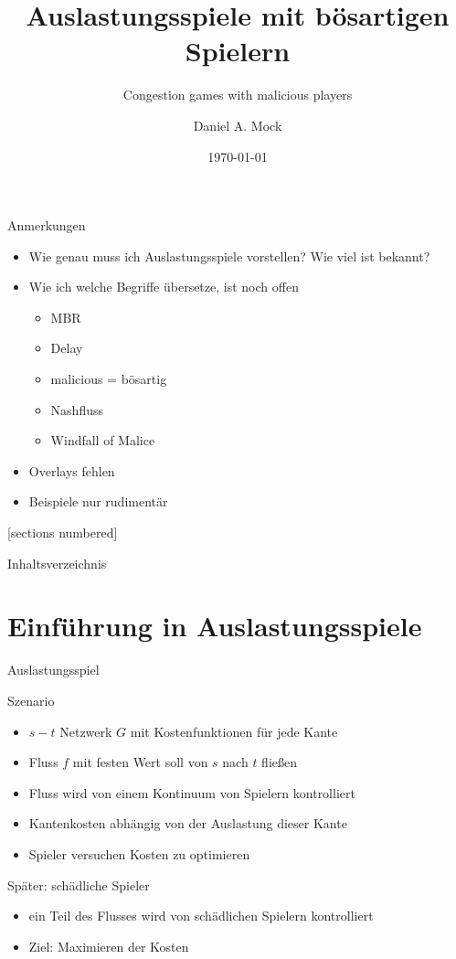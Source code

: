 \documentclass{beamer}
\title{Auslastungsspiele mit bösartigen Spielern}
\subtitle{Congestion games with malicious players}
\date{\today}
\author{Daniel A. Mock}
\institute{Lehrstuhl i1 -- RWTH Aachen}
\begin{document}
\begin{frame}{Anmerkungen}
	\begin{itemize}
		\item Wie genau muss ich Auslastungsspiele vorstellen? Wie viel ist bekannt?
		\item Wie ich welche Begriffe übersetze, ist noch offen
		\begin{itemize}
			\item MBR
			\item Delay
			\item malicious = bösartig
			\item Nashfluss
			\item Windfall of Malice
		\end{itemize}
		\item Overlays fehlen
		\item Beispiele nur rudimentär
	\end{itemize}
\end{frame}

\maketitle

[sections numbered]

\begin{frame}{Inhaltsverzeichnis}
	\tableofcontents
\end{frame}


\section{Einführung in Auslastungsspiele}
\begin{frame}{Auslastungsspiel}
	\begin{block}{Szenario}
		\begin{itemize}
			\item $s-t$ Netzwerk $G$ mit Kostenfunktionen für jede Kante
			\item Fluss $f$ mit festen Wert soll von $s$ nach $t$ fließen
			\item Fluss wird von einem Kontinuum von Spielern kontrolliert
			\item Kantenkosten abhängig von der Auslastung dieser Kante
			\item Spieler versuchen Kosten zu optimieren
		\end{itemize}
	\end{block}

	\begin{block}{Später: schädliche Spieler}
		\begin{itemize}
			\item ein Teil des Flusses wird von schädlichen Spielern kontrolliert
			\item Ziel: Maximieren der Kosten
		\end{itemize}
	\end{block}
\end{frame}
\end{document}
